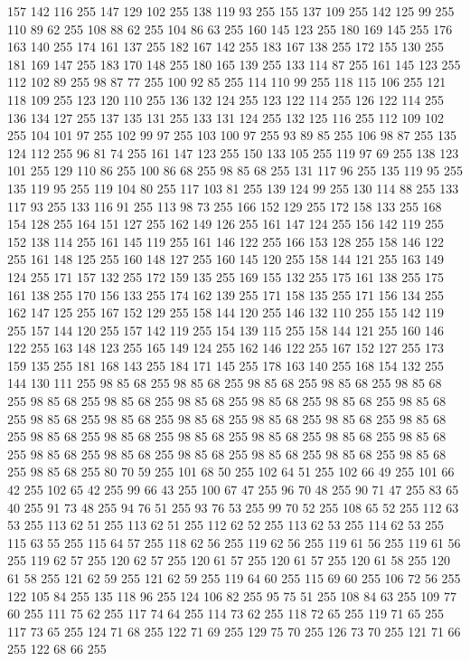 157 142 116 255 147 129 102 255 138 119 93 255 155 137 109 255 142 125 99 255 110 89 62 255 108 88 62 255 104 86 63 255 160 145 123 255 180 169 145 255 176 163 140 255 174 161 137 255 182 167 142 255 183 167 138 255 172 155 130 255 181 169 147 255 183 170 148 255 180 165 139 255 133 114 87 255 161 145 123 255 112 102 89 255 98 87 77 255 100 92 85 255 114 110 99 255 118 115 106 255 121 118 109 255 123 120 110 255 136 132 124 255 123 122 114 255 126 122 114 255 136 134 127 255 137 135 131 255 133 131 124 255 132 125 116 255 112 109 102 255 104 101 97 255 102 99 97 255 103 100 97 255 93 89 85 255 106 98 87 255 135 124 112 255 96 81 74 255 161 147 123 255 150 133 105 255 119 97 69 255 138 123 101 255 129 110 86 255 100 86 68 255 98 85 68 255 131 117 96 255 135 119 95 255 135 119 95 255 119 104 80 255 117 103 81 255 139 124 99 255 130 114 88 255 133 117 93 255 133 116 91 255 113 98 73 255 166 152 129 255 172 158 133 255 168 154 128 255 164 151 127 255 162 149 126 255
161 147 124 255 156 142 119 255 152 138 114 255 161 145 119 255 161 146 122 255 166 153 128 255 158 146 122 255 161 148 125 255 160 148 127 255 160 145 120 255 158 144 121 255 163 149 124 255 171 157 132 255 172 159 135 255 169 155 132 255 175 161 138 255 175 161 138 255 170 156 133 255 174 162 139 255 171 158 135 255 171 156 134 255 162 147 125 255 167 152 129 255 158 144 120 255 146 132 110 255 155 142 119 255 157 144 120 255 157 142 119 255 154 139 115 255 158 144 121 255 160 146 122 255 163 148 123 255 165 149 124 255 162 146 122 255 167 152 127 255 173 159 135 255 181 168 143 255 184 171 145 255 178 163 140 255 168 154 132 255 144 130 111 255 98 85 68 255 98 85 68 255 98 85 68 255 98 85 68 255 98 85 68 255 98 85 68 255 98 85 68 255 98 85 68 255 98 85 68 255 98 85 68 255 98 85 68 255 98 85 68 255 98 85 68 255 98 85 68 255 98 85 68 255 98 85 68 255 98 85 68 255 98 85 68 255 98 85 68 255 98 85 68 255 98 85 68 255 98 85 68 255 98 85 68 255
98 85 68 255 98 85 68 255 98 85 68 255 98 85 68 255 98 85 68 255 98 85 68 255 98 85 68 255 80 70 59 255 101 68 50 255 102 64 51 255 102 66 49 255 101 66 42 255 102 65 42 255 99 66 43 255 100 67 47 255 96 70 48 255 90 71 47 255 83 65 40 255 91 73 48 255 94 76 51 255 93 76 53 255 99 70 52 255 108 65 52 255 112 63 53 255 113 62 51 255 113 62 51 255 112 62 52 255 113 62 53 255 114 62 53 255 115 63 55 255 115 64 57 255 118 62 56 255 119 62 56 255 119 61 56 255 119 61 56 255 119 62 57 255 120 62 57 255 120 61 57 255 120 61 57 255 120 61 58 255 120 61 58 255 121 62 59 255 121 62 59 255 119 64 60 255 115 69 60 255 106 72 56 255 122 105 84 255 135 118 96 255 124 106 82 255 95 75 51 255 108 84 63 255 109 77 60 255 111 75 62 255 117 74 64 255 114 73 62 255 118 72 65 255 119 71 65 255 117 73 65 255 124 71 68 255 122 71 69 255 129 75 70 255 126 73 70 255 121 71 66 255 122 68 66 255
